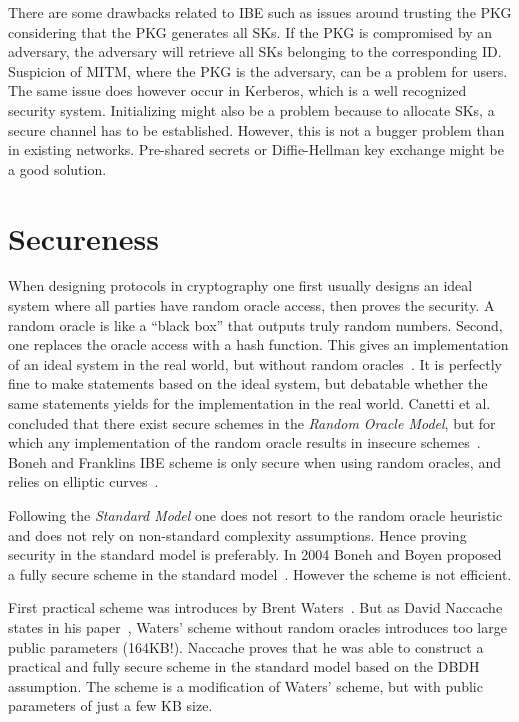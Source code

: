 There are some drawbacks related to \gls{IBE} such as issues around trusting the \gls{PKG} considering that the \gls{PKG} generates all \gls{SK}s.  
If the \gls{PKG} is compromised by an adversary, the adversary will retrieve all \gls{SK}s belonging to the corresponding \gls{ID}. 
Suspicion of \gls{MITM}, where the \gls{PKG} is the adversary, can be a problem for users.
The same issue does however occur in Kerberos, which is a well recognized security system.
Initializing might also be a problem because to allocate \gls{SK}s, a secure channel has to be established. 
However, this is not a bugger problem than in existing networks. 
Pre-shared secrets or Diffie-Hellman key exchange might be a good solution.

\section{Secureness}\label{ibe-secureness}
When designing protocols in cryptography one first usually designs an ideal system where all parties have random oracle access, then proves the security.
A random oracle is like a ``black box'' that outputs truly random numbers.
Second, one replaces the oracle access with a hash function.
This gives an implementation of an ideal system in the real world, but without random oracles~\cite{DBLP:conf/ccs/BellareR93}. 
It is perfectly fine to make statements based on the ideal system, but debatable whether the same statements yields for the implementation in the real world.
Canetti et al. concluded that there exist secure schemes in the \textit{Random Oracle Model}, but for which any implementation of the random oracle results in insecure schemes~\cite{DBLP:journals/jacm/CanettiGH04}.
Boneh and Franklins \gls{IBE} scheme is only secure when using random oracles, and relies on elliptic curves~\cite{DBLP:conf/crypto/BonehF01}.

Following the \textit{Standard Model} one does not resort to the random oracle heuristic and does not rely on non-standard complexity assumptions.
Hence proving security in the standard model is preferably.
In 2004 Boneh and Boyen proposed a fully secure scheme in the standard model~\cite{DBLP:conf/crypto/BonehB04}.
However the scheme is not efficient. 

First practical scheme was introduces by Brent Waters~\cite{DBLP:journals/iacr/Waters04}.
But as David Naccache states in his paper~\cite{DBLP:journals/iacr/Naccache05}, Waters' scheme without random oracles introduces too large public parameters (164\gls{KB}!).
Naccache proves that he was able to construct a practical and fully secure scheme in the standard model based on the \gls{DBDH} assumption.
The scheme is a modification of Waters' scheme, but with public parameters of just a few \gls{KB} size.

